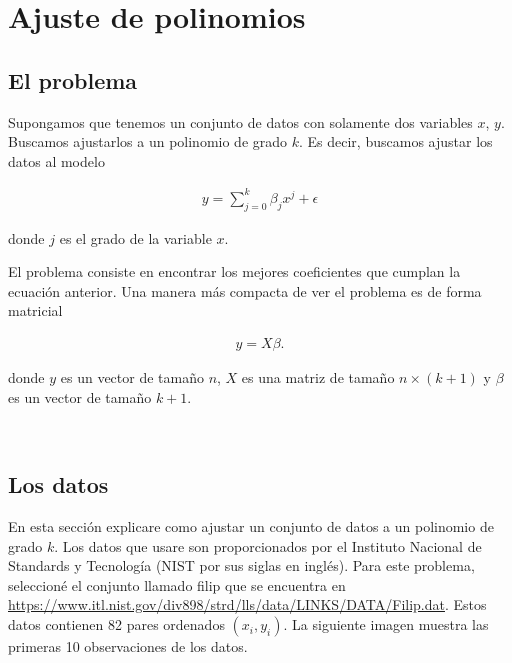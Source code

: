 \chapter{Ajuste de polinomios}

\section{El problema}
Supongamos que tenemos un conjunto de datos con solamente dos variables $x$, $y$. Buscamos ajustarlos a un polinomio de grado $k$. Es decir, buscamos ajustar los datos al modelo

\begin{equation*} 
    \begin{aligned}
    y = \sum_{j = 0}^{k} \beta_j x^j + \epsilon
    \end{aligned}
\end{equation*}

donde $j$ es el grado de la variable $x$. 

El problema consiste en encontrar los mejores coeficientes que cumplan la ecuación anterior. Una manera más compacta de ver el problema es de forma matricial 

\begin{equation}
\label{eq_matricial_pol}
    \begin{aligned}
    y = X \beta.
    \end{aligned}
\end{equation}

donde $y$ es un vector de tamaño $n$, $X$ es una matriz de tamaño $n \times (k + 1)$ y $\beta$ es un vector de tamaño $k + 1$. 

\\

\section{Los datos}
En esta sección explicare como ajustar un conjunto de datos a un polinomio de grado $k$. Los datos que usare son proporcionados por el Instituto Nacional de Standards y Tecnología (NIST por sus siglas en inglés). Para este problema, seleccioné el conjunto llamado filip que se encuentra en \url{https://www.itl.nist.gov/div898/strd/lls/data/LINKS/DATA/Filip.dat}. Estos datos contienen 82 pares ordenados $(x_i, y_i)$. La siguiente imagen muestra las primeras 10 observaciones de los datos. 

